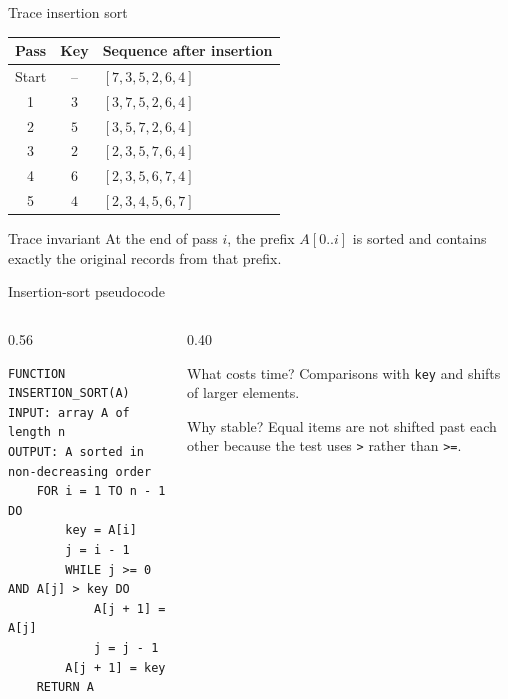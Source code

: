 \documentclass[aspectratio=169]{beamer}
\begin{document}
\begin{frame}{Trace insertion sort}
  \small
  \begin{center}
    \renewcommand{\arraystretch}{1.25}
    \begin{tabular}{ccl}
      \toprule
      \textbf{Pass} & \textbf{Key} & \textbf{Sequence after insertion} \\
      \midrule
      Start & -- & $[7,3,5,2,6,4]$ \\
      1 & $3$ & $[3,7,5,2,6,4]$ \\
      2 & $5$ & $[3,5,7,2,6,4]$ \\
      3 & $2$ & $[2,3,5,7,6,4]$ \\
      4 & $6$ & $[2,3,5,6,7,4]$ \\
      5 & $4$ & $[2,3,4,5,6,7]$ \\
      \bottomrule
    \end{tabular}
  \end{center}
  \begin{alertblock}{Trace invariant}
    At the end of pass $i$, the prefix $A[0..i]$ is sorted and contains exactly
    the original records from that prefix.
  \end{alertblock}
\end{frame}

\begin{frame}[fragile]{Insertion-sort pseudocode}
  \begin{columns}[T]
    \begin{column}{0.56\textwidth}
\begin{lstlisting}[style=pseudonumbered]
FUNCTION INSERTION_SORT(A)
INPUT: array A of length n
OUTPUT: A sorted in non-decreasing order
    FOR i = 1 TO n - 1 DO
        key = A[i]
        j = i - 1
        WHILE j >= 0 AND A[j] > key DO
            A[j + 1] = A[j]
            j = j - 1
        A[j + 1] = key
    RETURN A
\end{lstlisting}
    \end{column}
    \begin{column}{0.40\textwidth}
      \begin{block}{What costs time?}
        Comparisons with \texttt{key} and shifts of larger elements.
      \end{block}
      \begin{exampleblock}{Why stable?}
        Equal items are not shifted past each other because the test uses
        \texttt{>} rather than \texttt{>=}.
      \end{exampleblock}
    \end{column}
  \end{columns}
\end{frame}
\end{document}
